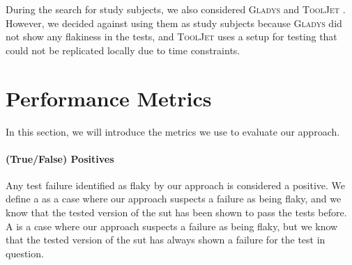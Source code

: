 During the search for study subjects, we also considered \textsc{Gladys} \autocite{noauthor_gladys_2023} and \textsc{ToolJet} \autocite{noauthor_tooljettooljet_2023}. However, we decided against using them as study subjects because \textsc{Gladys} did not show any flakiness in the tests, and \textsc{ToolJet} uses a setup for testing that could not be replicated locally due to time constraints.

\section{Performance Metrics}
In this section, we will introduce the metrics we use to evaluate our approach.

\paragraph{(True/False) Positives} Any test failure identified as flaky by our approach is considered a positive.
We define a  as a case where our approach suspects a failure as being flaky, and we know that the tested version of the \ac{sut} has been shown to pass the tests before.
A  is a case where our approach suspects a failure as being flaky, but we know that the tested version of the \ac{sut} has always shown a failure for the test in question.

